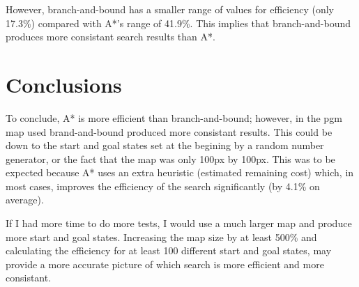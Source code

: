 \documentclass[11pt,oneside]{article}
\begin{document}
However, branch-and-bound has a smaller range of values for efficiency (only 17.3\%) compared with A*'s range of 41.9\%. This implies that branch-and-bound produces more consistant search results than A*.

\break
\section{Conclusions}
To conclude, A* is more efficient than branch-and-bound; however, in the pgm map used brand-and-bound produced more consistant results. This could be down to the start and goal states set at the begining by a random number generator, or the fact that the map was only 100px by 100px. This was to be expected because A* uses an extra heuristic (estimated remaining cost) which, in most cases, improves the efficiency of the search significantly (by 4.1\% on average).

If I had more time to do more tests, I would use a much larger map and produce more start and goal states. Increasing the map size by at least 500\% and calculating the efficiency for at least 100 different start and goal states, may provide a more accurate picture of which search is more efficient and more consistant.
\end{document}
